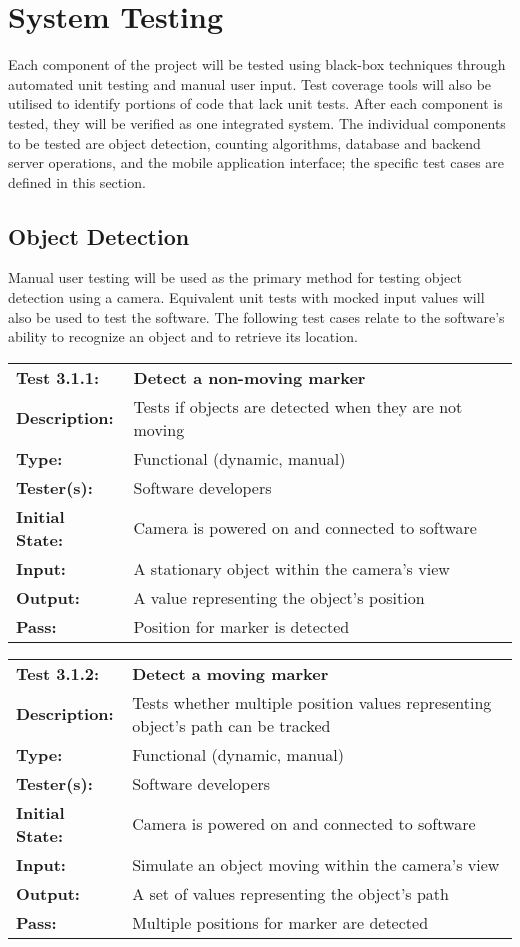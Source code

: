 \documentclass{article}
\newenvironment{testcase}
    {
    \begin{center}
    \begin{mdframed}[
        userdefinedwidth=15.5cm,
        leftmargin=1cm,
        rightmargin=1cm
        ]
    \begin{tabular}{p{2.5cm} p{9cm}}
    }
    {
    \end{tabular}
    \end{mdframed}
    \end{center}
    }
\newcommand{\tctit}[2]{\textbf{#1} & \textbf{#2}}
\newcommand{\tcdesc}{\textbf{Description:}}
\newcommand{\tctype}{\textbf{Type:}}
\newcommand{\testers}{\textbf{Tester(s):}}
\newcommand{\tcinit}{\textbf{Initial State:}}
\newcommand{\tcin}{\textbf{Input:}}
\newcommand{\tcout}{\textbf{Output:}}
\newcommand{\tcpass}{\textbf{Pass:}}
\begin{document}
\section{System Testing}
Each component of the project will be tested using black-box techniques through automated unit testing and manual user input. Test coverage tools will also be utilised to identify portions of code that lack unit tests. After each component is tested, they will be verified as one integrated system. The individual components to be tested are object detection, counting algorithms, database and backend server operations, and the mobile application interface; the specific test cases are defined in this section.

\subsection{Object Detection}
Manual user testing will be used as the primary method for testing object detection using a camera. Equivalent unit tests with mocked input values will also be used to test the software. The following test cases relate to the software’s ability to recognize an object and to retrieve its location.


\begingroup
\begin{testcase}
    \tctit{Test 3.1.1:}{Detect a non-moving marker} \\
    \tcdesc & Tests if objects are detected when they are not moving\\
    \tctype & Functional (dynamic, manual) \\
    \testers & Software developers \\
    \tcinit & Camera is powered on and connected to software \\
    \tcin & A stationary object within the camera’s view \\
    \tcout & A value representing the object's position \\
    \tcpass & Position for marker is detected \\
\end{testcase}
\endgroup

\begingroup
\begin{testcase}
    \tctit{Test 3.1.2:}{Detect a moving marker} \\
    \tcdesc & Tests whether multiple position values representing object's path can be tracked\\
    \tctype & Functional (dynamic, manual) \\
    \testers & Software developers \\
    \tcinit & Camera is powered on and connected to software \\
    \tcin &  Simulate an object moving within the camera’s view \\
    \tcout & A set of values representing the object’s path \\
    \tcpass & Multiple positions for marker are detected \\
\end{testcase}
\endgroup
\end{document}
